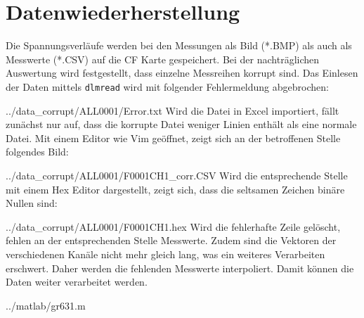\section{Datenwiederherstellung}
Die Spannungsverläufe werden bei den Messungen als Bild (*.BMP) als auch als 
Messwerte (*.CSV) auf die CF Karte gespeichert. Bei der nachträglichen 
Auswertung wird festgestellt, dass einzelne Messreihen korrupt sind. 
Das Einlesen der Daten mittels \verb!dlmread! wird mit folgender Fehlermeldung 
abgebrochen: 

{../data_corrupt/ALL0001/Error.txt}
Wird die Datei in Excel importiert, fällt zunächst nur auf, dass die korrupte 
Datei weniger Linien enthält als eine normale Datei. Mit einem Editor wie Vim 
geöffnet, zeigt sich an der betroffenen Stelle folgendes Bild: 

{../data_corrupt/ALL0001/F0001CH1_corr.CSV}
\clearpage
Wird die entsprechende Stelle mit einem Hex Editor dargestellt, zeigt sich, 
dass die seltsamen Zeichen binäre Nullen sind: 

{../data_corrupt/ALL0001/F0001CH1.hex}
Wird die fehlerhafte Zeile gelöscht, fehlen an der entsprechenden Stelle 
Messwerte. Zudem sind die Vektoren der verschiedenen Kanäle nicht mehr gleich 
lang, was ein weiteres Verarbeiten erschwert. Daher werden die fehlenden 
Messwerte interpoliert. Damit können die Daten weiter verarbeitet werden. 

{../matlab/gr631.m}

